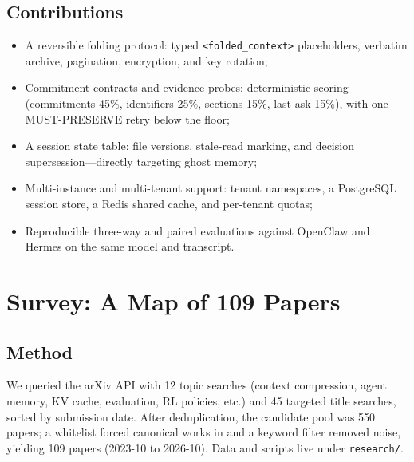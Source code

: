 \documentclass[11pt,a4paper]{article}
\begin{document}
\subsection{Contributions}
\begin{itemize}
  \item A reversible folding protocol: typed \texttt{<folded\_context>} placeholders, verbatim archive, pagination, encryption, and key rotation;
  \item Commitment contracts and evidence probes: deterministic scoring (commitments 45\%, identifiers 25\%, sections 15\%, last ask 15\%), with one MUST-PRESERVE retry below the floor;
  \item A session state table: file versions, stale-read marking, and decision supersession---directly targeting ghost memory;
  \item Multi-instance and multi-tenant support: tenant namespaces, a PostgreSQL session store, a Redis shared cache, and per-tenant quotas;
  \item Reproducible three-way and paired evaluations against OpenClaw and Hermes on the same model and transcript.
\end{itemize}

\section{Survey: A Map of 109 Papers}

\subsection{Method}
We queried the arXiv API with 12 topic searches (context compression, agent memory, KV cache, evaluation, RL policies, etc.) and 45 targeted title searches, sorted by submission date. After deduplication, the candidate pool was 550 papers; a whitelist forced canonical works in and a keyword filter removed noise, yielding 109 papers (2023-10 to 2026-10). Data and scripts live under \texttt{research/}.
\end{document}
